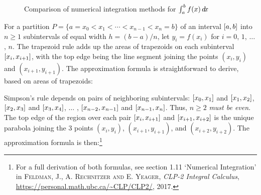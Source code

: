 \begin{figure}[ht]
{}
 \caption[]{\enskip Comparison of numerical integration methods for $\int_a^b f(x)\,d\!x$}
 \label{fig:nummethods}
\end{figure}

For a partition $P= \lbrace a=x_0 < x_1 < \cdots < x_{n-1} < x_n = b \rbrace$ of
an interval $\lbrack a,b \rbrack$ into $n \ge 1$ subintervals of equal width
$h = (b-a)/n$, let $y_i = f(x_i)$ for $i = 0$, $1$, $\ldots$, $n$.
The trapezoid rule adds up the areas of trapezoids on each subinterval
$\lbrack x_i,x_{i+1} \rbrack$, with the top edge being the line segment joining the
points $(x_i,y_i)$ and $(x_{i+1},y_{i+1})$. The approximation formula is
straightforward to derive, based on areas of trapezoids:


Simpson's rule depends on pairs of neighboring subintervals:
$\lbrack x_0,x_1 \rbrack$ and $\lbrack x_1,x_2 \rbrack$,
$\lbrack x_2,x_3 \rbrack$ and $\lbrack x_3,x_4 \rbrack$, $\ldots$ ,
$\lbrack x_{n-2},x_{n-1} \rbrack$ and $\lbrack x_{n-1},x_n \rbrack$.
Thus, $n \ge 2$ \emph{must be even}. The top edge of the region over each pair
$\lbrack x_{i},x_{i+1} \rbrack$ and $\lbrack x_{i+1},x_{i+2} \rbrack$ is the unique parabola
joining the 3 points $(x_i,y_i)$, $(x_{i+1},y_{i+1})$, and $(x_{i+2},y_{i+2})$.
The approximation formula is then:\footnote{For a full derivation of both
formulas, see section 1.11 `Numerical Integration' in \textsc{Feldman, J., A. Rechnitzer and E. Yeager}, \emph{CLP-2 Integral Calculus},
\url{https://personal.math.ubc.ca/~CLP/CLP2/}, 2017.}

